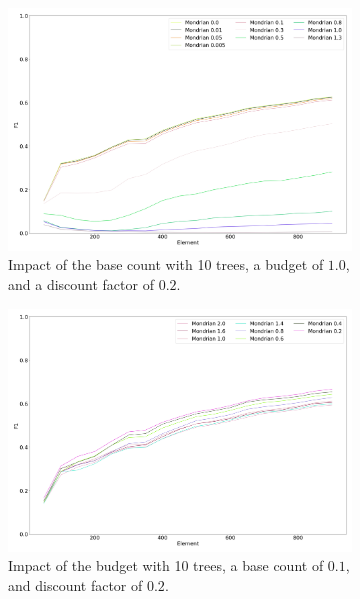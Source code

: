 \begin{figure}
	 \centering
	 \begin{subfigure}[b]{0.49\textwidth}
		\centering
		\includegraphics[width=\textwidth]{figures/calibration_mondrian_base.png}
		\caption{Impact of the base count with 10 trees, a budget of $1.0$, and a discount factor of $0.2$.} 
		\label{fig:mondrian-base-count}
	\end{subfigure}
	\hfill
	 \begin{subfigure}[b]{0.49\textwidth}
		 \centering
		 \includegraphics[width=\textwidth]{figures/calibration_mondrian_lifetime.png}
		 \caption{Impact of the budget with 10 trees, a base count of $0.1$, and discount factor of $0.2$.}
		 \label{fig:mondrian-budget}
	 \end{subfigure}
	 \hfill
	 \begin{subfigure}[b]{0.49\textwidth}

\end{subfigure}
\end{figure}
